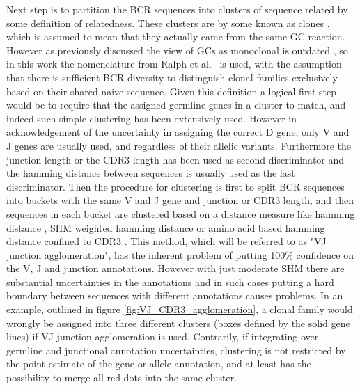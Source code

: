 Next step is to partition the BCR sequences into clusters of sequence related by some definition of relatedness.
These clusters are by some known as clones \cite{gupta2017hierarchical}, which is assumed to mean that they actually came from the same GC reaction.
However as previously discussed the view of GCs as monoclonal is outdated \cite{tas2016visualizing}, so in this work the nomenclature from Ralph et al.\ \cite{ralph2016likelihood} is used, with the assumption that there is sufficient BCR diversity to distinguish clonal families exclusively based on their shared naive sequence.
Given this definition a logical first step would be to require that the assigned germline genes in a cluster to match, and indeed such simple clustering has been extensively used.
However in acknowledgement of the uncertainty in assigning the correct D gene, only V and J genes are usually used, and regardless of their allelic variants.
Furthermore the junction length or the CDR3 length has been used as second discriminator and the hamming distance between sequences is usually used as the last discriminator.
Then the procedure for clustering is first to split BCR sequences into buckets with the same V and J gene and junction or CDR3 length, and then sequences in each bucket are clustered based on a distance measure like hamming distance \cite{glanville2011naive}, SHM weighted hamming distance \cite{gupta2017hierarchical} or amino acid based hamming distance confined to CDR3 \cite{jiang2013lineage}.
This method, which will be referred to as "VJ junction agglomeration", has the inherent problem of putting 100\% confidence on the V, J and junction annotations.
However with just moderate SHM there are substantial uncertainties in the annotations and in such cases putting a hard boundary between sequences with different annotations causes problems.
In an example, outlined in figure \ref{fig:VJ_CDR3_agglomeration}, a clonal family would wrongly be assigned into three different clusters (boxes defined by the solid gene lines) if VJ junction agglomeration is used.
Contrarily, if integrating over germline and junctional annotation uncertainties, clustering is not restricted by the point estimate of the gene or allele annotation, and at least has the possibility to merge all red dots into the same cluster.

